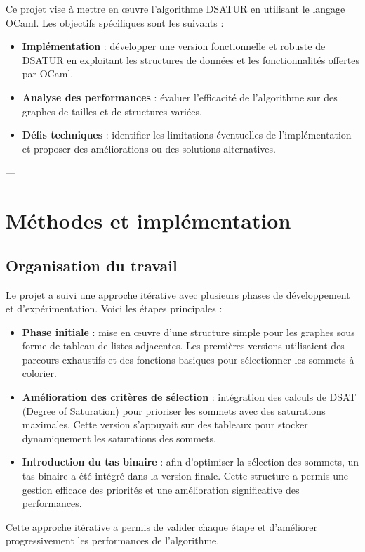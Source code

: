 \documentclass[11pt]{article}
\begin{document}
Ce projet vise à mettre en œuvre l'algorithme DSATUR en utilisant le langage OCaml. Les objectifs spécifiques sont les suivants :
\begin{itemize}
    \item \textbf{Implémentation} : développer une version fonctionnelle et robuste de DSATUR en exploitant les structures de données et les fonctionnalités offertes par OCaml.
    \item \textbf{Analyse des performances} : évaluer l'efficacité de l'algorithme sur des graphes de tailles et de structures variées.
    \item \textbf{Défis techniques} : identifier les limitations éventuelles de l'implémentation et proposer des améliorations ou des solutions alternatives.
\end{itemize} 

---

\section{Méthodes et implémentation}

\subsection{Organisation du travail}

Le projet a suivi une approche itérative avec plusieurs phases de développement et d'expérimentation. Voici les étapes principales :
\begin{itemize}
    \item \textbf{Phase initiale} : mise en œuvre d’une structure simple pour les graphes sous forme de tableau de listes adjacentes. Les premières versions utilisaient des parcours exhaustifs et des fonctions basiques pour sélectionner les sommets à colorier.
    \item \textbf{Amélioration des critères de sélection} : intégration des calculs de DSAT (Degree of Saturation) pour prioriser les sommets avec des saturations maximales. Cette version s’appuyait sur des tableaux pour stocker dynamiquement les saturations des sommets.
    \item \textbf{Introduction du tas binaire} : afin d’optimiser la sélection des sommets, un tas binaire a été intégré dans la version finale. Cette structure a permis une gestion efficace des priorités et une amélioration significative des performances.
\end{itemize}
Cette approche itérative a permis de valider chaque étape et d’améliorer progressivement les performances de l’algorithme.
\end{document}

